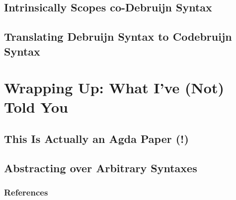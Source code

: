 \documentclass[aspectratio=169]{beamer}
\theoremstyle{remarkstyle}
\begin{document}
\subsection{Intrinsically Scopes co-Debruijn Syntax}

\subsection{Translating Debruijn Syntax to Codebruijn Syntax}


\section{Wrapping Up: What I've (Not) Told You}
\subsection{This Is Actually an Agda Paper (!)}
\subsection{Abstracting over Arbitrary Syntaxes}

\begin{frame}[fragile]
  \frametitle{References}
  \nocite{catsandtypes}
  \printbibliography{}
\end{frame}
\end{document}
